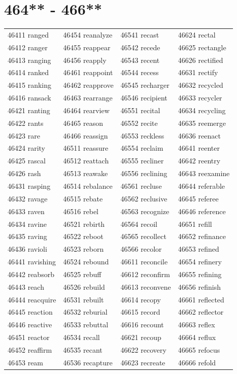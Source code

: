 \documentclass[10pt, oneside]{book}
\begin{document}
\begin{table}
	\centering
	\section*{464** - 466**}
	\begin{tabular}{l l l l}
46411 ranged &46454 reanalyze &46541 recast &46624 rectal\\
46412 ranger &46455 reappear &46542 recede &46625 rectangle\\
46413 ranging &46456 reapply &46543 recent &46626 rectified\\
46414 ranked &46461 reappoint &46544 recess &46631 rectify\\
46415 ranking &46462 reapprove &46545 recharger &46632 recycled\\
46416 ransack &46463 rearrange &46546 recipient &46633 recycler\\
46421 ranting &46464 rearview &46551 recital &46634 recycling\\
46422 rants &46465 reason &46552 recite &46635 reemerge\\
46423 rare &46466 reassign &46553 reckless &46636 reenact\\
46424 rarity &46511 reassure &46554 reclaim &46641 reenter\\
46425 rascal &46512 reattach &46555 recliner &46642 reentry\\
46426 rash &46513 reawake &46556 reclining &46643 reexamine\\
46431 rasping &46514 rebalance &46561 recluse &46644 referable\\
46432 ravage &46515 rebate &46562 reclusive &46645 referee\\
46433 raven &46516 rebel &46563 recognize &46646 reference\\
46434 ravine &46521 rebirth &46564 recoil &46651 refill\\
46435 raving &46522 reboot &46565 recollect &46652 refinance\\
46436 ravioli &46523 reborn &46566 recolor &46653 refined\\
46441 ravishing &46524 rebound &46611 reconcile &46654 refinery\\
46442 reabsorb &46525 rebuff &46612 reconfirm &46655 refining\\
46443 reach &46526 rebuild &46613 reconvene &46656 refinish\\
46444 reacquire &46531 rebuilt &46614 recopy &46661 reflected\\
46445 reaction &46532 reburial &46615 record &46662 reflector\\
46446 reactive &46533 rebuttal &46616 recount &46663 reflex\\
46451 reactor &46534 recall &46621 recoup &46664 reflux\\
46452 reaffirm &46535 recant &46622 recovery &46665 refocus\\
46453 ream &46536 recapture &46623 recreate &46666 refold\\
	\end{tabular}
 \end{table}
\clearpage
\end{document}
